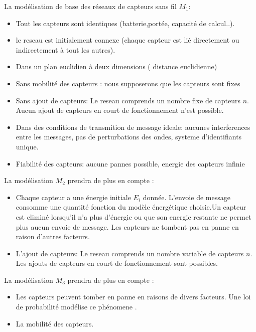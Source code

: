   La modélisation de base des réseaux de capteurs sans fil \textbf{$M_1$}:
\begin{itemize}
 \item Tout les capteurs sont identiques (batterie,portée, capacité de calcul..).
 \item le reseau est initialement connexe (chaque capteur est lié directement ou indirectement à tout les autres).
 \item Dans un plan euclidien à deux dimensions ( distance euclidienne)
 \item Sans mobilité des capteurs : nous supposerons que les capteurs sont fixes
 \item Sans ajout de capteurs: Le reseau comprends un nombre fixe de capteurs $n$. Aucun ajout de capteurs en court de fonctionnement n'est possible.
 \item Dans des conditions de transmition de message ideale: aucunes interferences entre les messages, pas de perturbations des ondes, systeme d'identifiants unique.
 \item Fiabilité des capteurs: aucune pannes possible, energie des capteurs infinie \\

\end{itemize}

  La modélisation \textbf{$M_2$} prendra de plus en compte :
\begin{itemize}
 \item Chaque capteur a une énergie initiale $E_i$ donnée. L'envoie de message consomme une quantité fonction du modèle énergétique choisie.Un capteur est eliminé lorsqu'il n'a plus d'énergie ou que son energie restante ne permet plus
aucun envoie de message. Les capteurs ne tombent pas en panne en raison d'autres facteurs.   
 \item L'ajout de capteurs: Le reseau comprends un nombre variable de capteurs $n$. Les ajouts de capteurs en court de fonctionnement sont possibles.\\
 
\end{itemize}

  La modélisation \textbf{$M_3$} prendra de plus en compte :
\begin{itemize}
 \item Les capteurs peuvent tomber en panne en raisons de divers facteurs. Une loi de probabilité modélise ce phénomene  .   
 \item La mobilité des capteurs.\\
 
\end{itemize}


